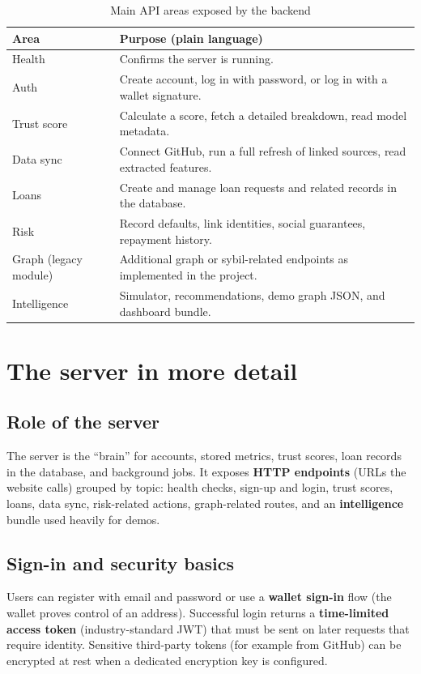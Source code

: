 \documentclass[11pt,a4paper]{article}
\begin{document}
\begin{table}[htbp]
\centering
\caption{Main API areas exposed by the backend}
\label{tab:apis}
\begin{tabular}{@{}p{3.2cm}p{10cm}@{}}
\toprule
\textbf{Area} & \textbf{Purpose (plain language)} \\
\midrule
Health & Confirms the server is running. \\
Auth & Create account, log in with password, or log in with a wallet signature. \\
Trust score & Calculate a score, fetch a detailed breakdown, read model metadata. \\
Data sync & Connect GitHub, run a full refresh of linked sources, read extracted features. \\
Loans & Create and manage loan requests and related records in the database. \\
Risk & Record defaults, link identities, social guarantees, repayment history. \\
Graph (legacy module) & Additional graph or sybil-related endpoints as implemented in the project. \\
Intelligence & Simulator, recommendations, demo graph JSON, and dashboard bundle. \\
\bottomrule
\end{tabular}
\end{table}

\section{The server in more detail}
\subsection{Role of the server}
The server is the ``brain'' for accounts, stored metrics, trust scores, loan records in the database, and background jobs. It exposes \textbf{HTTP endpoints} (URLs the website calls) grouped by topic: health checks, sign-up and login, trust scores, loans, data sync, risk-related actions, graph-related routes, and an \textbf{intelligence} bundle used heavily for demos.

\subsection{Sign-in and security basics}
Users can register with email and password or use a \textbf{wallet sign-in} flow (the wallet proves control of an address). Successful login returns a \textbf{time-limited access token} (industry-standard JWT) that must be sent on later requests that require identity. Sensitive third-party tokens (for example from GitHub) can be encrypted at rest when a dedicated encryption key is configured.
\end{document}
